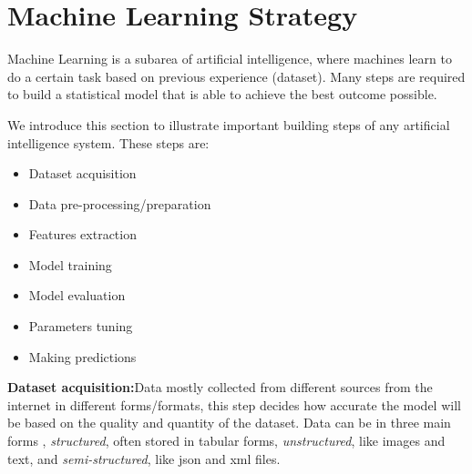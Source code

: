 

\pagebreak

\section{Machine Learning Strategy}
\label{Machine Learning Strategy}
Machine Learning is a subarea of artificial intelligence, where machines learn to do a certain task based on previous experience (dataset). Many steps are required to build a statistical model that is able to achieve the best outcome possible.

We introduce this section to illustrate important building steps of any artificial intelligence system. These steps are:

\begin{itemize}
  \item Dataset acquisition
  \item Data pre-processing/preparation
  \item Features extraction
  \item Model training
  \item Model evaluation
  \item Parameters tuning
  \item Making predictions
\end{itemize}

\textbf{Dataset acquisition:}Data mostly collected from different sources from the internet in different forms/formats, this step decides how accurate the model will be based on the quality and quantity of the dataset.
Data can be in three main forms , \textit{structured}, often stored in tabular forms, \textit{unstructured}, like images and text, and \textit{semi-structured}, like json and xml files.\newline


